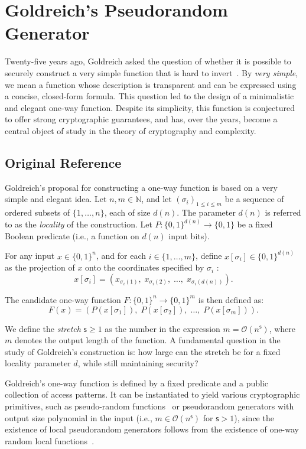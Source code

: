 \section{Goldreich's Pseudorandom Generator}
\label{sec:goldreich}

Twenty-five years ago, Goldreich asked the question of whether it is possible to securely construct a very simple function that is hard to invert~\cite{DBLP:journals/eccc/ECCC-TR00-090}. By \emph{very simple}, we mean a function whose description is transparent and can be expressed using a concise, closed-form formula. This question led to the design of a minimalistic and elegant one-way function. Despite its simplicity, this function is conjectured to offer strong cryptographic guarantees, and has, over the years, become a central object of study in the theory of cryptography and complexity.  


\subsection{Original Reference}


Goldreich's proposal for constructing a one-way function is based on a very simple and elegant idea. Let $ n, m \in \mathbb{N}$, and let $ (\sigma_i)_{1 \leq i \leq m}$   be a sequence of ordered subsets of $\{1, \dots, n\}$, each of size $ d(n)$. The parameter $d(n)$ is referred to as the \emph{locality} of the construction. Let $P : \{0,1\}^{d(n)} \to \{0,1\}$ be a fixed Boolean predicate  (i.e., a function on $d(n)$ input bits).

For any input $x \in \{0,1\}^n$, and for each $i \in \{1, \dots, m\}$, define  $x[\sigma_i] \in \{0,1\}^{d(n)}$   as the projection of $x$   onto the coordinates specified by $ \sigma_i$  :
\[
x[\sigma_i] = \left( x_{\sigma_i(1)},\; x_{\sigma_i(2)},\; \dots,\; x_{\sigma_i(d(n))} \right).
\]

The candidate one-way function $F: \{0,1\}^n \to \{0,1\}^m$   is then defined as:
\[
F(x) = \left( P(x[\sigma_1]),\; P(x[\sigma_2]),\; \dots,\; P(x[\sigma_m]) \right).
\]

We define the \emph{stretch} $\mathsf{s} \geq 1$ as the number in the expression  $m = \mathcal{O}(n^{\mathsf{s}})$, where $m$ denotes the output length of the function. A fundamental question in the study of Goldreich’s construction is: how large can the stretch be for a fixed locality parameter $d$, while still maintaining security?

Goldreich's one-way function is defined by a fixed predicate and a public collection of access patterns. It can be instantiated to yield various cryptographic primitives, such as pseudo-random functions~\cite{TCC:AppRay16b} or pseudorandom generators with output size polynomial in the input (i.e., $m \in \mathcal{O}(n^\mathsf{s})$ for $\mathsf{s} > 1$), since the existence of local pseudorandom generators follows from the existence of one-way random local functions~\cite{STOC:Applebaum12}.


